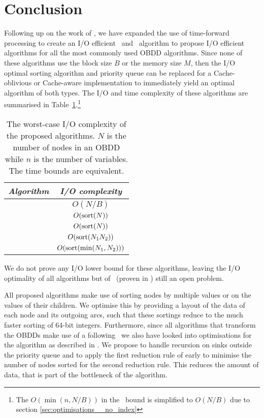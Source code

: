 \section{Conclusion} \label{sec:conclusion}
Following up on the work of \cite{Arge96}, we have expanded the use of
time-forward processing to create an I/O efficient \Reduce\ and \Apply\
algorithm to propose I/O efficient algorithms for all the most commonly used
OBDD algorithms. Since none of these algorithms use the block size $B$ or the
memory size $M$, then the I/O optimal sorting algorithm and priority queue can
be replaced for a Cache-oblivious or Cache-aware implementation to immediately
yield an optimal algorithm of both types. The I/O and time complexity of these
algorithms are summarised in Table~\ref{tab:summary_efficiency}.\footnote{The
  $O(\min(n, N/B))$ in the \Evaluate\ bound is simplified to $O(N/B)$ due to
  section \ref{sec:optimisations__no_index}}

\begin{table}[ht!]
  \centering
  \begin{tabular}{c | c}
    \emph{Algorithm} & \emph{I/O complexity}
    \\ \hline \hline
    \Evaluate & $O(N/B)$
    \\
    \Reduce & $O(\text{sort}(N))$
    \\
    \Restrict & $O(\text{sort}(N))$
    \\
    \Apply & $O(\text{sort}(N_1 N_2))$
    \\
    \Isomorphic & $O(\text{sort}(\min(N_1, N_2)))$
    \\
  \end{tabular}
  \caption{The worst-case I/O complexity of the proposed algorithms. $N$ is the
    number of nodes in an OBDD while $n$ is the number of variables. The time
    bounds are equivalent.}
  \label{tab:summary_efficiency}
\end{table}

We do not prove any I/O lower bound for these algorithms, leaving the I/O
optimality of all algorithms but of \Reduce\ (proven in \cite{Arge96}) still an
open problem.

All proposed algorithms make use of sorting nodes by multiple values or on the
values of their children. We optimise this by providing a layout of the data of
each node and its outgoing arcs, such that these sortings reduce to the much
faster sorting of $64$-bit integers. Furthermore, since all algorithms that
transform the OBDDs make use of a following \Reduce\ we also have looked into
optimisations for the algorithm as described in \cite{Arge96}. We propose to
handle recursion on sinks outside the priority queue and to apply the first
reduction rule of \cite{Bryant86} early to minimise the number of nodes sorted
for the second reduction rule. This reduces the amount of data, that is part of
the bottleneck of the algorithm.


